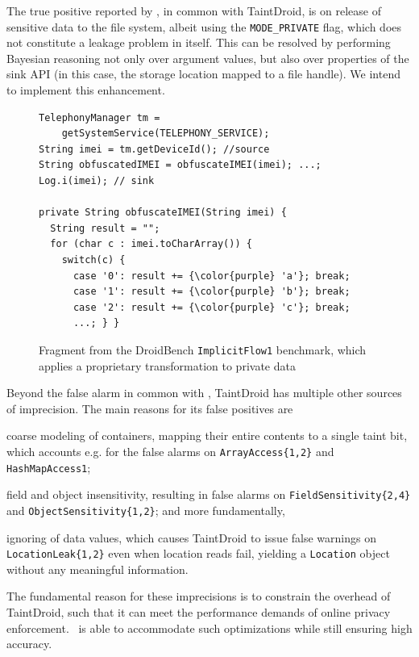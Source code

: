 The true positive reported by \Tool, in common with TaintDroid, is on release of sensitive data to the file system, albeit using the {\tt MODE\_PRIVATE} flag, which does not constitute a leakage problem in itself. This can be resolved by performing Bayesian reasoning not only over argument values, but also over properties of the sink API (in this case, the storage location mapped to a file handle). We intend to implement this enhancement. 

\begin{figure}
\begin{lstlisting}
TelephonyManager tm = 
    getSystemService(TELEPHONY_SERVICE);
String imei = tm.getDeviceId(); //source
String obfuscatedIMEI = obfuscateIMEI(imei); ...;
Log.i(imei); // sink

private String obfuscateIMEI(String imei) {
  String result = "";
  for (char c : imei.toCharArray()) { 
    switch(c) { 
      case '0': result += {\color{purple} 'a'}; break;
      case '1': result += {\color{purple} 'b'}; break;
      case '2': result += {\color{purple} 'c'}; break; 
      ...; } }
\end{lstlisting}
\caption{\label{Fi:dataTransform} Fragment from the DroidBench {\tt ImplicitFlow1} benchmark, which applies a proprietary transformation to private data}
\end{figure}


Beyond the false alarm in common with \Tool, TaintDroid has multiple other sources of imprecision. The main reasons for its false positives are
\begin{compactitem}
	\item coarse modeling of containers, mapping their entire contents to a single taint bit, which accounts e.g. for the false alarms on {\tt ArrayAccess\{1,2\}} and {\tt HashMapAccess1};
	\item field and object insensitivity, resulting in false alarms on {\tt FieldSensitivity\{2,4\}} and {\tt ObjectSensitivity\{1,2\}}; and more fundamentally,
	\item ignoring of data values, which causes TaintDroid to issue false warnings on {\tt LocationLeak\{1,2\}} even when location reads fail, yielding a {\tt Location} object without any meaningful information.
\end{compactitem} 
The fundamental reason for these imprecisions is to constrain the overhead of TaintDroid, such that it can meet the performance demands of online privacy enforcement. \Tool\ is able to accommodate such optimizations while still ensuring high accuracy. 

